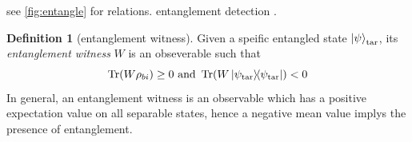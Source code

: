 \documentclass[
reprint,
aps,
pra,
]{revtex4-2}
\theoremstyle{plain}
\theoremstyle{definition}
\newtheorem{definition}{Definition}
\newcommand{\ew}{W}
\newcommand{\ob}{O}
\newcommand{\target}{\textup{tar}}
\newcommand{\dm}{\rho}
\begin{document}
see \cref{fig:entangle} for relations.
entanglement detection \cite{guhneEntanglementDetection2009}.
\begin{definition}[entanglement witness]\label{def:entanglement_witness}
	Given a speific entangled state $\ket{\psi}_{\target}$, its \emph{entanglement witness} $\ew$ is an obseverable such that
	\begin{equation}
		\Tr(\ew\dm_{bi}) \ge 0  \text{ and }
		\Tr(\ew\op{\psi_{\target}}) < 0 
	\end{equation}
	In general, an entanglement witness is an observable which has a positive expectation value on all separable states, hence a negative mean value implys the presence of entanglement.
\end{definition}
\end{document}
